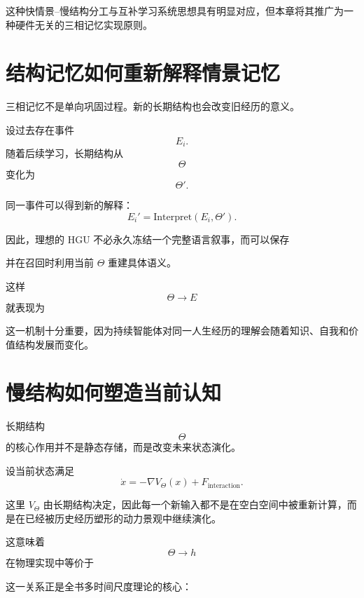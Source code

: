 这种快情景--慢结构分工与互补学习系统思想具有明显对应，但本章将其推广为一种硬件无关的三相记忆实现原则。

\section{结构记忆如何重新解释情景记忆}

三相记忆不是单向巩固过程。新的长期结构也会改变旧经历的意义。

设过去存在事件
\[
E_i.
\]
随着后续学习，长期结构从
\[
\Theta
\]
变化为
\[
\Theta'.
\]

同一事件可以得到新的解释：
\[
\boxed{
E_i'
=
\mathrm{Interpret}(E_i,\Theta').
}
\]

因此，理想的 HGU 不必永久冻结一个完整语言叙事，而可以保存
\begin{statementbox}
\centering
{}
\end{statementbox}
并在召回时利用当前 $\Theta$ 重建具体语义。

这样
\[
\Theta\rightarrow E
\]
就表现为
\begin{statementbox}
\centering
{}
\end{statementbox}

这一机制十分重要，因为持续智能体对同一人生经历的理解会随着知识、自我和价值结构发展而变化。

\section{慢结构如何塑造当前认知}

长期结构
\[
\Theta
\]
的核心作用并不是静态存储，而是改变未来状态演化。

设当前状态满足
\[
\dot x
=
-\nabla V_\Theta(x)
+
F_{\mathrm{interaction}}.
\]

这里 $V_\Theta$ 由长期结构决定，因此每一个新输入都不是在空白空间中被重新计算，而是在已经被历史经历塑形的动力景观中继续演化。

这意味着
\[
\Theta\rightarrow h
\]
在物理实现中等价于
\begin{statementbox}
\centering
{}
\end{statementbox}

这一关系正是全书多时间尺度理论的核心：
\begin{statementbox}
\centering
{}
\end{statementbox}

